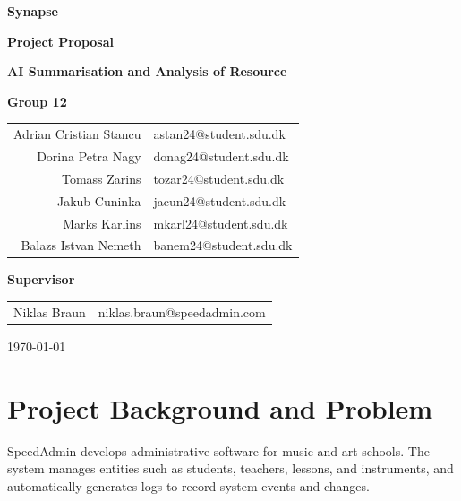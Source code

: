 \documentclass[12pt, a4paper]{article}
\begin{document}
\begin{titlepage}
    \centering
    \vspace*{2cm}

    {\Huge\bfseries Synapse \par}
    \vfill
    {\Large\bfseries Project Proposal \par}
    {\large\bfseries AI Summarisation and Analysis of Resource \par}
    \vspace{1.5cm}

    \vfill
    {\Large \textbf{Group 12}} \\
    \vspace{0.25cm}
    \begin{tabular}{r | l}
        Adrian Cristian Stancu & astan24@student.sdu.dk \\
        Dorina Petra Nagy      & donag24@student.sdu.dk \\
        Tomass Zarins          & tozar24@student.sdu.dk \\
        Jakub Cuninka          & jacun24@student.sdu.dk \\
        Marks Karlins          & mkarl24@student.sdu.dk \\
        Balazs Istvan Nemeth   & banem24@student.sdu.dk \\
    \end{tabular}
    \vspace{1cm}

    {\Large \textbf{Supervisor}} \\
    \vspace{0.25cm}
    \begin{tabular}{r | l}
        Niklas Braun & niklas.braun@speedadmin.com \\
    \end{tabular}

    \vfill
    {\large \today}
\end{titlepage}

\tableofcontents
\newpage

\section{Project Background and Problem} \label{sec:problem}

SpeedAdmin develops administrative software for music and art schools. The system manages entities such as students, teachers, lessons, and instruments, and automatically generates logs to record system events and changes.
\end{document}
